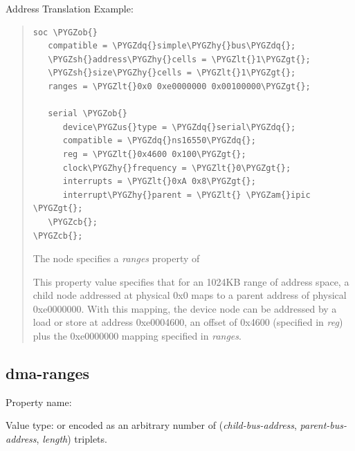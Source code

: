 \documentclass[a4paper,10pt,oneside]{sphinxmanual}
\def\PYGZus{\char`\_}
\def\PYGZob{\char`\{}
\def\PYGZcb{\char`\}}
\def\PYGZam{\char`\&}
\def\PYGZlt{\char`\<}
\def\PYGZgt{\char`\>}
\def\PYGZsh{\char`\#}
\def\PYGZhy{\char`\-}
\def\PYGZdq{\char`\"}
\begin{document}
Address Translation Example:
\begin{quote}

\begin{Verbatim}[commandchars=\\\{\}]
soc \PYGZob{}
   compatible = \PYGZdq{}simple\PYGZhy{}bus\PYGZdq{};
   \PYGZsh{}address\PYGZhy{}cells = \PYGZlt{}1\PYGZgt{};
   \PYGZsh{}size\PYGZhy{}cells = \PYGZlt{}1\PYGZgt{};
   ranges = \PYGZlt{}0x0 0xe0000000 0x00100000\PYGZgt{};

   serial \PYGZob{}
      device\PYGZus{}type = \PYGZdq{}serial\PYGZdq{};
      compatible = \PYGZdq{}ns16550\PYGZdq{};
      reg = \PYGZlt{}0x4600 0x100\PYGZgt{};
      clock\PYGZhy{}frequency = \PYGZlt{}0\PYGZgt{};
      interrupts = \PYGZlt{}0xA 0x8\PYGZgt{};
      interrupt\PYGZhy{}parent = \PYGZlt{} \PYGZam{}ipic \PYGZgt{};
   \PYGZcb{};
\PYGZcb{};
\end{Verbatim}

The  node specifies a \emph{ranges} property of
\begin{quote}

\end{quote}

This property value specifies that for an 1024KB range of address space,
a child node addressed at physical 0x0 maps to a parent address of
physical 0xe0000000. With this mapping, the  device node can
be addressed by a load or store at address 0xe0004600, an offset of
0x4600 (specified in \emph{reg}) plus the 0xe0000000 mapping specified in
\emph{ranges}.
\end{quote}


\subsection{dma-ranges}
\label{devicetree-basics:dma-ranges}
Property name: 

Value type:  or  encoded as an arbitrary number of
(\emph{child-bus-address}, \emph{parent-bus-address}, \emph{length}) triplets.
\end{document}

